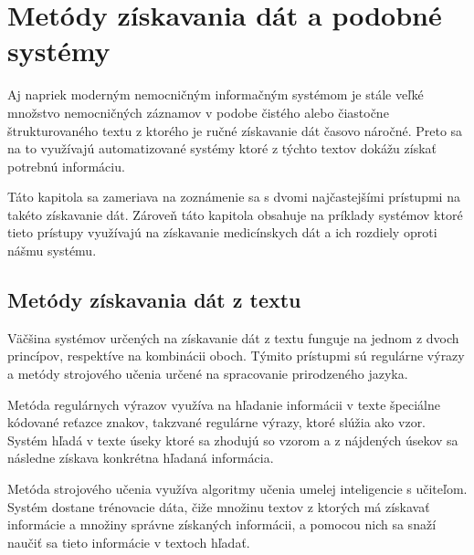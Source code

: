 \chapter{Metódy získavania dát a podobné systémy}

Aj napriek moderným nemocničným informačným
systémom je stále veľké množstvo nemocničných záznamov v
podobe čistého alebo čiastočne štrukturovaného 
textu z ktorého je ručné získavanie dát časovo náročné.
Preto sa na to využívajú automatizované systémy ktoré z týchto textov dokážu získať potrebnú informáciu. 

Táto kapitola sa zameriava na zoznámenie sa s dvomi najčastejšími prístupmi na takéto získavanie dát. Zároveň táto kapitola obsahuje na príklady systémov ktoré tieto prístupy využívajú na získavanie medicínskych dát a ich rozdiely oproti nášmu systému.

\section{Metódy získavania dát z textu}


Väčšina systémov určených na získavanie dát z textu funguje na jednom z dvoch princípov, 
respektíve na kombinácii oboch. Týmito prístupmi
sú regulárne výrazy a metódy strojového učenia
určené na spracovanie prirodzeného jazyka.

Metóda regulárnych výrazov využíva na hľadanie informácii v texte
špeciálne kódované reťazce znakov, takzvané regulárne výrazy, ktoré slúžia ako vzor. 
Systém hľadá v texte úseky ktoré sa zhodujú so vzorom a z 
nájdených úsekov sa následne získava konkrétna hľadaná informácia.

Metóda strojového učenia využíva algoritmy učenia umelej inteligencie s učiteľom. Systém dostane trénovacie dáta, čiže množinu textov z ktorých má získavať informácie a množiny správne získaných informácii, a pomocou nich sa snaží naučiť sa tieto informácie v textoch hľadať. 


